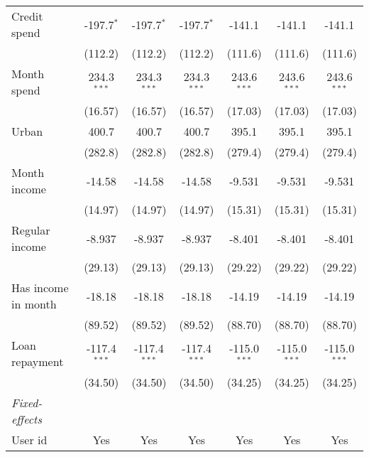 \begin{table}[htbp]
\begin{threeparttable}[b]
\begin{tabular}{lcccccc}
         Credit spend            & -197.7$^{*}$   & -197.7$^{*}$   & -197.7$^{*}$   & -141.1         & -141.1         & -141.1\\   
                                 & (112.2)        & (112.2)        & (112.2)        & (111.6)        & (111.6)        & (111.6)\\   
         Month spend             & 234.3$^{***}$  & 234.3$^{***}$  & 234.3$^{***}$  & 243.6$^{***}$  & 243.6$^{***}$  & 243.6$^{***}$\\   
                                 & (16.57)        & (16.57)        & (16.57)        & (17.03)        & (17.03)        & (17.03)\\   
         Urban                   & 400.7          & 400.7          & 400.7          & 395.1          & 395.1          & 395.1\\   
                                 & (282.8)        & (282.8)        & (282.8)        & (279.4)        & (279.4)        & (279.4)\\   
         Month income            & -14.58         & -14.58         & -14.58         & -9.531         & -9.531         & -9.531\\   
                                 & (14.97)        & (14.97)        & (14.97)        & (15.31)        & (15.31)        & (15.31)\\   
         Regular income          & -8.937         & -8.937         & -8.937         & -8.401         & -8.401         & -8.401\\   
                                 & (29.13)        & (29.13)        & (29.13)        & (29.22)        & (29.22)        & (29.22)\\   
         Has income in month     & -18.18         & -18.18         & -18.18         & -14.19         & -14.19         & -14.19\\   
                                 & (89.52)        & (89.52)        & (89.52)        & (88.70)        & (88.70)        & (88.70)\\   
         Loan repayment          & -117.4$^{***}$ & -117.4$^{***}$ & -117.4$^{***}$ & -115.0$^{***}$ & -115.0$^{***}$ & -115.0$^{***}$\\   
                                 & (34.50)        & (34.50)        & (34.50)        & (34.25)        & (34.25)        & (34.25)\\   
         \midrule
         \emph{Fixed-effects}\\
         User id                 & Yes            & Yes            & Yes            & Yes            & Yes            & Yes\\  

\end{tabular}
\end{threeparttable}
\end{table}
